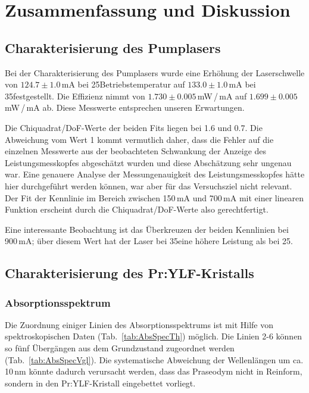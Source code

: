 \section{Zusammenfassung und Diskussion}

\subsection{Charakterisierung des Pumplasers}

Bei der Charakterisierung des Pumplasers wurde eine Erhöhung der Laserschwelle von
$124.7\pm1.0$\,mA bei 25\grad Betriebstemperatur auf $133.0\pm1.0$\,mA bei 35\grad festgestellt.
Die Effizienz nimmt von $1.730\pm0.005$\,mW\,/\,mA auf $1.699\pm0.005$\,mW\,/\,mA ab.
Diese Messwerte entsprechen unseren Erwartungen.

Die Chiquadrat/DoF-Werte der beiden Fits liegen bei 1.6 und 0.7.
Die Abweichung vom Wert 1 kommt vermutlich daher,
dass die Fehler auf die einzelnen Messwerte aus der beobachteten Schwankung der Anzeige des
Leistungsmesskopfes abgeschätzt wurden und diese Abschätzung sehr ungenau war.
Eine genauere Analyse der Messungenauigkeit des Leistungsmesskopfes hätte hier durchgeführt werden
können, war aber für das Versuchsziel nicht relevant.
Der Fit der Kennlinie im Bereich zwischen 150\,mA und 700\,mA mit einer linearen Funktion erscheint
durch die Chiquadrat/DoF-Werte also gerechtfertigt.

Eine interessante Beobachtung ist das Überkreuzen der beiden Kennlinien bei 900\,mA;
über diesem Wert hat der Laser bei 35\grad eine höhere Leistung als bei 25\grad.

\subsection{Charakterisierung des Pr:YLF-Kristalls}

\subsubsection{Absorptionsspektrum}

Die Zuordnung einiger Linien des Absorptionsspektrums ist mit Hilfe von spektroskopischen Daten
(Tab.~\ref{tab:AbsSpecTh}) möglich.
Die Linien 2-6 können so fünf Übergängen aus dem Grundzustand zugeordnet werden
(Tab.~\ref{tab:AbsSpecVgl}).
Die systematische Abweichung der Wellenlängen um ca. 10\,nm könnte dadurch verursacht werden,
dass das Praseodym nicht in Reinform, sondern in den Pr:YLF-Kristall eingebettet vorliegt.

